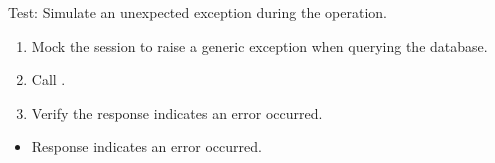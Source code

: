 \documentclass[letterpaper,10pt,english]{sphinxmanual}
\begin{document}
\begin{fulllineitems}
\label{\detokenize{test:test.test_room.test_list_rooms_room_unexpected_exception}}
\pysigstartsignatures
\pysiglinewithargsret
{}
{\sphinxparamcomma {}}
{}
\pysigstopsignatures
\sphinxAtStartPar
Test: Simulate an unexpected exception during the operation.
\begin{description}
\begin{enumerate}
%
\item {} 
\sphinxAtStartPar
Mock the session to raise a generic exception when querying the database.

\item {} 
\sphinxAtStartPar
Call .

\item {} 
\sphinxAtStartPar
Verify the response indicates an error occurred.

\end{enumerate}

\begin{itemize}
\item {} 
\sphinxAtStartPar
Response indicates an error occurred.

\end{itemize}

\end{description}

\end{fulllineitems}

\end{document}
